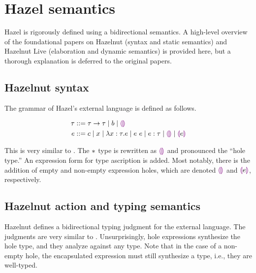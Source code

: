 \section{Hazel semantics}
\label{sec:hazel-semantics}

Hazel is rigorously defined using a bidirectional semantics. A high-level overview of the foundational papers on Hazelnut (syntax and static semantics) and Hazelnut Live (elaboration and dynamic semantics) is provided here, but a thorough explanation is deferred to the original papers.

\subsection{Hazelnut syntax}
\label{sec:hazel-syntax}

The grammar of Hazel's external language is defined as follows.

\begin{singlespace}
  \begin{align*}
    \tau &::= \tau\to\tau
           \mid b
           \mid \textcolor{violet}{\llparenthesis}\textcolor{violet}{\rrparenthesis} \\
    e &::= c
        \mid x
        \mid\lambda x:\tau.e
        \mid e\ e
        \mid e:\tau
        \mid \textcolor{violet}{\llparenthesis}\textcolor{violet}{\rrparenthesis}
        \mid \textcolor{violet}{\llparenthesis} e\textcolor{violet}{\rrparenthesis}
  \end{align*}
\end{singlespace}

This is very similar to \gtlc{}. The $*{}$ type is rewritten as $\textcolor{violet}{\llparenthesis}\textcolor{violet}{\rrparenthesis}$ and pronounced the ``hole type.'' An expression form for type ascription is added. Most notably, there is the addition of empty and non-empty expression holes, which are denoted $\textcolor{violet}{\llparenthesis}\textcolor{violet}{\rrparenthesis}$ and $\textcolor{violet}{\llparenthesis} e\textcolor{violet}{\rrparenthesis}$, respectively.

\subsection{Hazelnut action and typing semantics}
\label{sec:hazel-statics}

Hazelnut \cite{conf/popl/Hazelnut17} defines a bidirectional typing judgment for the external language.  The judgments are very similar to \gtlc{}. Unsurprisingly, hole expressions synthesize the hole type, and they analyze against any type. Note that in the case of a non-empty hole, the encapsulated expression must still synthesize a type, i.e., they are well-typed.

